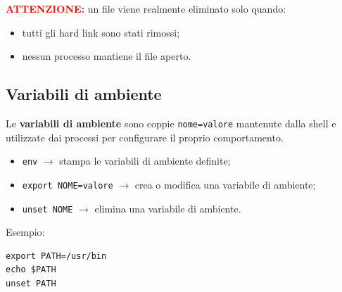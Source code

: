 \noindent \textbf{\textcolor{red}{ATTENZIONE:}} un file viene realmente eliminato
solo quando:
\begin{itemize}
    \item tutti gli hard link sono stati rimossi;
    \item nessun processo mantiene il file aperto.
\end{itemize}

\vspace{0.3cm}

\subsection{Variabili di ambiente}
Le \textbf{variabili di ambiente} sono coppie \texttt{nome=valore}
mantenute dalla shell e utilizzate dai processi per configurare il proprio comportamento.

\begin{itemize}
    \item \texttt{env} $\rightarrow$ stampa le variabili di ambiente definite;
    
    \item \texttt{export NOME=valore} $\rightarrow$
    crea o modifica una variabile di ambiente;
    
    \item \texttt{unset NOME} $\rightarrow$
    elimina una variabile di ambiente.
\end{itemize}

\noindent Esempio:
\begin{verbatim}
export PATH=/usr/bin
echo $PATH
unset PATH
\end{verbatim}

